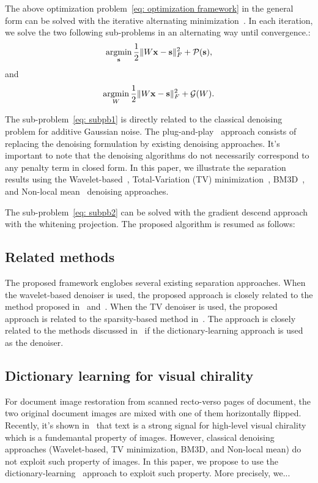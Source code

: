 \documentclass[conference]{IEEEtran}
\newcommand{\argmin}{\mathop{\mathrm{argmin}}}
\theoremstyle{plain}
\begin{document}
The above optimization problem~\eqref{eq: optimization framework} in the general form can be solved with the iterative alternating minimization~\cite{tseng2001convergence}. In each iteration, we solve the two following sub-problems in an alternating way until convergence.:
\begin{equation}
\label{eq: subpb1}
	\argmin_{\bs} \frac{1}{2} \|W\bx - \bs\|_F^2 + \mathcal{P}(\bs),
\end{equation}
and 
\begin{equation}
\label{eq: subpb2}
\argmin_{W} \frac{1}{2} \|W\bx - \bs\|_F^2 + \mathcal{G}(W).
\end{equation}

The sub-problem~\eqref{eq: subpb1} is directly related to the classical denoising problem for additive Gaussian noise. The plug-and-play~\cite{venkatakrishnan2013plug,chan2016plug,ono2017primal} approach consists of replacing the denoising formulation by existing denoising approaches. It's important to note that the denoising algorithms do not necessarily correspond to any penalty term in closed form. In this paper, we illustrate the separation results using the Wavelet-based~\cite{donoho1994ideal,chang2000adaptive}, Total-Variation (TV) minimization~\cite{chambolle2004algorithm}, BM3D~\cite{dabov2007image}, and Non-local mean~\cite{buades2005non} denoising approaches.

The sub-problem~\eqref{eq: subpb2} can be solved with the gradient descend approach with the whitening projection. The proposed algorithm is resumed as follows:




\subsection{Related methods}
The proposed framework englobes several existing separation approaches. When the wavelet-based denoiser is used, the proposed approach is closely related to the method proposed in~\cite{ichir2003wavelet} and~\cite{kutyniok2010image}. When the TV denoiser is used, the proposed approach is related to the sparsity-based method in~\cite{souidene2007blind}. The approach is closely related to the methods discussed in~\cite{zhao2014blind} if the dictionary-learning approach is used as the denoiser.

\subsection{Dictionary learning for visual chirality}
For document image restoration from scanned recto-verso pages of document, the two original document images are mixed with one of them horizontally flipped. Recently, it's shown in~\cite{lin2020visual} that text is a strong signal for high-level visual chirality which is a fundemantal property of images. However, classical denoising approaches (Wavelet-based, TV minimization, BM3D, and Non-local mean) do not exploit such property of images. In this paper, we propose to use the dictionary-learning~\cite{elad2006image} approach to exploit such property. More precisely, we...
\end{document}
